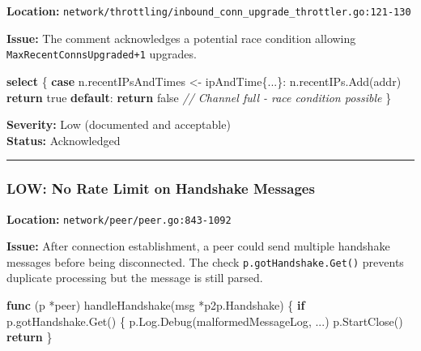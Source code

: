 \documentclass[
]{article}
\newenvironment{Shaded}{}{}
\newcommand{\CommentTok}[1]{\textcolor[rgb]{0.38,0.63,0.69}{\textit{#1}}}
\newcommand{\ControlFlowTok}[1]{\textcolor[rgb]{0.00,0.44,0.13}{\textbf{#1}}}
\newcommand{\KeywordTok}[1]{\textcolor[rgb]{0.00,0.44,0.13}{\textbf{#1}}}
\newcommand{\NormalTok}[1]{#1}
\newcommand{\OperatorTok}[1]{\textcolor[rgb]{0.40,0.40,0.40}{#1}}
\newcommand{\OtherTok}[1]{\textcolor[rgb]{0.00,0.44,0.13}{#1}}
\begin{document}
\textbf{Location:}
\texttt{network/throttling/inbound\_conn\_upgrade\_throttler.go:121-130}

\textbf{Issue:} The comment acknowledges a potential race condition
allowing \texttt{MaxRecentConnsUpgraded+1} upgrades.

\begin{Shaded}
\begin{Highlighting}[]
\ControlFlowTok{select} \OperatorTok{\{}
\ControlFlowTok{case}\NormalTok{ n}\OperatorTok{.}\NormalTok{recentIPsAndTimes }\OperatorTok{\textless{}{-}}\NormalTok{ ipAndTime}\OperatorTok{\{...\}:}
\NormalTok{    n}\OperatorTok{.}\NormalTok{recentIPs}\OperatorTok{.}\NormalTok{Add}\OperatorTok{(}\NormalTok{addr}\OperatorTok{)}
    \ControlFlowTok{return} \OtherTok{true}
\ControlFlowTok{default}\OperatorTok{:}
    \ControlFlowTok{return} \OtherTok{false}  \CommentTok{// Channel full {-} race condition possible}
\OperatorTok{\}}
\end{Highlighting}
\end{Shaded}

\textbf{Severity:} Low (documented and acceptable)\\
\textbf{Status:} Acknowledged

\begin{center}\rule{0.5\linewidth}{0.5pt}\end{center}

\subsubsection{LOW: No Rate Limit on Handshake
Messages}\label{low-no-rate-limit-on-handshake-messages}

\textbf{Location:} \texttt{network/peer/peer.go:843-1092}

\textbf{Issue:} After connection establishment, a peer could send
multiple handshake messages before being disconnected. The check
\texttt{p.gotHandshake.Get()} prevents duplicate processing but the
message is still parsed.

\begin{Shaded}
\begin{Highlighting}[]
\KeywordTok{func} \OperatorTok{(}\NormalTok{p }\OperatorTok{*}\NormalTok{peer}\OperatorTok{)}\NormalTok{ handleHandshake}\OperatorTok{(}\NormalTok{msg }\OperatorTok{*}\NormalTok{p2p}\OperatorTok{.}\NormalTok{Handshake}\OperatorTok{)} \OperatorTok{\{}
    \ControlFlowTok{if}\NormalTok{ p}\OperatorTok{.}\NormalTok{gotHandshake}\OperatorTok{.}\NormalTok{Get}\OperatorTok{()} \OperatorTok{\{}
\NormalTok{        p}\OperatorTok{.}\NormalTok{Log}\OperatorTok{.}\NormalTok{Debug}\OperatorTok{(}\NormalTok{malformedMessageLog}\OperatorTok{,} \OperatorTok{...)}
\NormalTok{        p}\OperatorTok{.}\NormalTok{StartClose}\OperatorTok{()}
        \ControlFlowTok{return}
    \OperatorTok{\}}
\end{Highlighting}
\end{Shaded}
\end{document}
